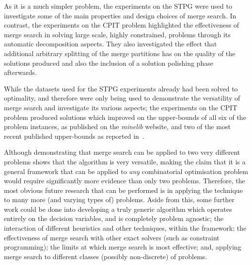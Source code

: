 \documentclass[journal]{IEEEtran}
\begin{document}
As it is a much simpler problem, the experiments on the STPG were used to investigate some of the main properties and design choices of merge search. In contrast, the experiments on the CPIT problem highlighted the effectiveness of merge search in solving large scale, highly constrained, problems through its automatic decomposition aspects. They also investigated the effect that additional arbitrary splitting of the merge partitions has on the quality of the solutions produced and also the inclusion of a solution polishing phase afterwards.

While the datasets used for the STPG experiments already had been solved to optimality, and therefore were only being used to demonstrate the versatility of merge search and investigate its various aspects; the experiments on the CPIT problem produced solutions which improved on the upper-bounds of all six of the problem instances, as published on the \emph{minelib} website, and two of the most recent published upper-bounds as reported in~\cite{minelib-improved}.

\smallskip

Although demonstrating that merge search can be applied to two very different problems shows that the algorithm is very versatile, making the claim that it is a general framework that can be applied to \emph{any} combinatorial optimisation problem would require significantly more evidence than only two problems. Therefore, the most obvious future research that can be performed is in applying the technique to many more (and varying types of) problems. Aside from this, some further work could be done into developing a truly generic algorithm which operates entirely on the decision variables, and is completely problem agnostic; the interaction of different heuristics and other techniques, within the framework; the effectiveness of merge search with other exact solvers (such as constraint programming); the limits at which merge search is most effective; and, applying merge search to different classes (possibly non-discrete) of problems.


% 
% 
% 
% 
\end{document}
